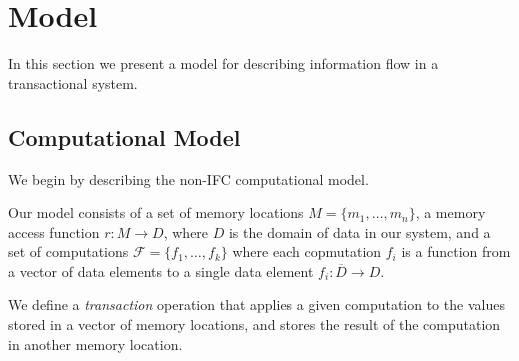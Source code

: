 \section{Model} %
\label{sec:model}

In this section we present a model for describing information flow in a transactional system.

\subsection{Computational Model} %
\label{sub:computational_model}
We begin by describing the non-IFC computational model.

Our model consists of a set of memory locations $M=\{m_1,\dots,m_n\}$, a memory access function $r: M \rightarrow D$, where $D$ is the domain of data in our system, and a set of computations $\mathcal{F} = \{f_1,\ldots,f_k\}$ where each copmutation $f_i$ is a function from a vector of data elements to a single data element $f_i:\overline{D} \rightarrow D$.

We define a \emph{transaction} operation that applies a given computation to the values stored in a vector of memory locations, and stores the result of the computation in another memory location. 



